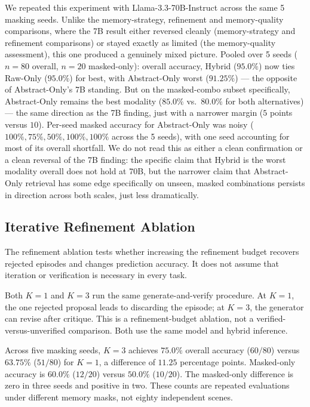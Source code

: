 We repeated this experiment with Llama-3.3-70B-Instruct across the same 5 masking seeds. Unlike the memory-strategy, refinement and memory-quality comparisons, where the 7B result either reversed cleanly (memory-strategy and refinement comparisons) or stayed exactly as limited (the memory-quality assessment), this one produced a genuinely mixed picture. Pooled over 5 seeds ($n=80$ overall, $n=20$ masked-only): overall accuracy, Hybrid ($95.0\%$) now ties Raw-Only ($95.0\%$) for best, with Abstract-Only worst ($91.25\%$) --- the opposite of Abstract-Only's 7B standing. But on the masked-combo subset specifically, Abstract-Only remains the best modality ($85.0\%$ vs.\ $80.0\%$ for both alternatives) --- the same direction as the 7B finding, just with a narrower margin ($5$ points versus $10$). Per-seed masked accuracy for Abstract-Only was noisy ($100\%, 75\%, 50\%, 100\%, 100\%$ across the 5 seeds), with one seed accounting for most of its overall shortfall. We do not read this as either a clean confirmation or a clean reversal of the 7B finding: the specific claim that Hybrid is the worst modality overall does not hold at 70B, but the narrower claim that Abstract-Only retrieval has some edge specifically on unseen, masked combinations persists in direction across both scales, just less dramatically.


\subsection{Iterative Refinement Ablation}
\label{sec:exp3}

The refinement ablation tests whether increasing the refinement budget recovers rejected episodes and changes prediction accuracy. It does not assume that iteration or verification is necessary in every task.

Both $K=1$ and $K=3$ run the same generate-and-verify procedure. At $K=1$, the one rejected proposal leads to discarding the episode; at $K=3$, the generator can revise after critique. This is a refinement-budget ablation, not a verified-versus-unverified comparison. Both use the same model and hybrid inference.

Across five masking seeds, $K=3$ achieves $75.0\%$ overall accuracy ($60/80$) versus $63.75\%$ ($51/80$) for $K=1$, a difference of $11.25$ percentage points. Masked-only accuracy is $60.0\%$ ($12/20$) versus $50.0\%$ ($10/20$). The masked-only difference is zero in three seeds and positive in two. These counts are repeated evaluations under different memory masks, not eighty independent scenes.

